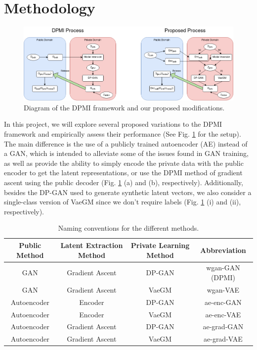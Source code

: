 \documentclass{article}
\begin{document}
\section{Methodology}

\begin{figure}[!h]
    \centering
    \includegraphics[width=\columnwidth]{images/setup.png}
    \caption{Diagram of the DPMI framework and our proposed modifications.}
    \label{fig:setup}
\end{figure}

In this project, we will explore several proposed variations to the DPMI framework and empirically assess their performance (See Fig. \ref{fig:setup} for the setup). The main difference is the use of a publicly trained autoencoder (AE) instead of a GAN, which is intended to alleviate some of the issues found in GAN training, as well as provide the ability to simply encode the private data with the public encoder to get the latent representations, or use the DPMI method of gradient ascent using the public decoder (Fig. \ref{fig:setup} (a) and (b), respectively). Additionally, besides the DP-GAN \cite{dpgan} used to generate synthetic latent vectors, we also consider a single-class version of VaeGM \cite{dp_gen} since we don’t require labels (Fig. \ref{fig:setup} (i) and (ii), respectively). 

\begin{table}
    \centering
    \begin{tabular}[!h]{|c|c|c|c|}
        \hline
        \textbf{Public Method} & \textbf{Latent Extraction Method} & \textbf{Private Learning Method} & \textbf{Abbreviation}\\
        \hline
        GAN & Gradient Ascent & DP-GAN & wgan-GAN (DPMI)\\
        \hline
        GAN & Gradient Ascent & VaeGM & wgan-VAE\\
        \hline
        Autoencoder & Encoder & DP-GAN & ae-enc-GAN\\
        \hline
        Autoencoder & Encoder & VaeGM & ae-enc-VAE\\
        \hline
        Autoencoder & Gradient Ascent & DP-GAN & ae-grad-GAN\\
        \hline
        Autoencoder & Gradient Ascent & VaeGM & ae-grad-VAE\\
        \hline
    \end{tabular}
    \caption{Naming conventions for the different methods.}
    \label{fig:naming}
\end{table}
\end{document}
